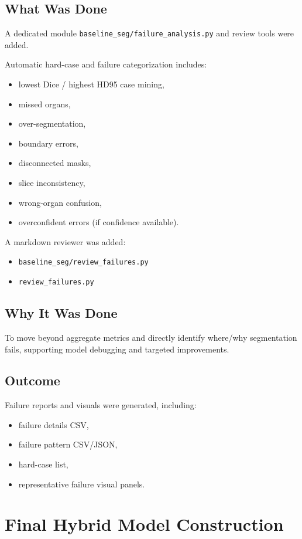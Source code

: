 \documentclass[11pt,a4paper]{article}
\begin{document}
\subsection{What Was Done}
A dedicated module \texttt{baseline\_seg/failure\_analysis.py} and review tools were added.

Automatic hard-case and failure categorization includes:
\begin{itemize}[leftmargin=1.5em]
  \item lowest Dice / highest HD95 case mining,
  \item missed organs,
  \item over-segmentation,
  \item boundary errors,
  \item disconnected masks,
  \item slice inconsistency,
  \item wrong-organ confusion,
  \item overconfident errors (if confidence available).
\end{itemize}

A markdown reviewer was added:
\begin{itemize}[leftmargin=1.5em]
  \item \texttt{baseline\_seg/review\_failures.py}
  \item \texttt{review\_failures.py}
\end{itemize}

\subsection{Why It Was Done}
To move beyond aggregate metrics and directly identify where/why segmentation fails, supporting model debugging and targeted improvements.

\subsection{Outcome}
Failure reports and visuals were generated, including:
\begin{itemize}[leftmargin=1.5em]
  \item failure details CSV,
  \item failure pattern CSV/JSON,
  \item hard-case list,
  \item representative failure visual panels.
\end{itemize}

\section{Final Hybrid Model Construction}
\end{document}
